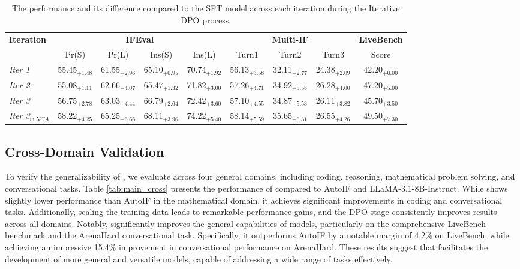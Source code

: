 \begin{table*}[ht]
    \centering
    \small
    \caption{The performance and its difference compared to the SFT model across each iteration during the Iterative DPO process.}
    \begin{tabular}{lcccccccc}
    \toprule
    \multirow{2}{*}{\textbf{Iteration}} &  \multicolumn{4}{c}{\textbf{IFEval}} & \multicolumn{3}{c}{\textbf{Multi-IF}} & \textbf{LiveBench} \\ 
    \cmidrule(r){2-5}  \cmidrule(r){6-8} \cmidrule(r){9-9} 
    & Pr(S) & Pr(L) & Ins(S) & Ins(L) & Turn1 & Turn2 & Turn3 & Score \\ 
    \midrule
    \textit{Iter 1} & 55.45$_{+1.48}$ & 61.55$_{+2.96}$ & 65.10$_{+0.95}$ & 70.74$_{+1.92}$ & 56.13$_{+3.58}$ & 32.11$_{+2.77}$ & 24.38$_{+2.09}$ & 42.20$_{+0.00}$ \\
    \textit{Iter 2} & 55.08$_{+1.11}$ & 62.66$_{+4.07}$ & 65.47$_{+1.32}$ & 71.82$_{+3.00}$ & 57.26$_{+4.71}$ & 34.92$_{+5.58}$ & 26.28$_{+4.00}$ & 47.20$_{+5.00}$ \\
    \textit{Iter 3} & 56.75$_{+2.78}$ & 63.03$_{+4.44}$ & 66.79$_{+2.64}$ & 72.42$_{+3.60}$ & 57.10$_{+4.55}$ & 34.87$_{+5.53}$ & 26.11$_{+3.82}$ & 45.70$_{+3.50}$ \\
    \textit{Iter 3$_{w. NCA}$}  & 58.22$_{+4.25}$ & 65.25$_{+6.66}$ & 68.11$_{+3.96}$ & 74.22$_{+5.40}$ & 58.14$_{+5.59}$ & 35.65$_{+6.31}$ & 26.55$_{+4.26}$ & 49.50$_{+7.30}$ \\
    \bottomrule
    \end{tabular}
    \label{tab:iterative_dpo}
\end{table*}


\subsection{Cross-Domain Validation}
To verify the generalizability of \method, we evaluate \method across four general domains, including coding, reasoning, mathematical problem solving, and conversational tasks. Table \ref{tab:main_cross} presents the performance of \method compared to AutoIF and LLaMA-3.1-8B-Instruct. While \method shows slightly lower performance than AutoIF in the mathematical domain, it achieves significant improvements in coding and conversational tasks. Additionally, scaling the training data leads to remarkable performance gains, and the DPO stage consistently improves results across all domains. Notably, \method significantly improves the general capabilities of models, particularly on the comprehensive LiveBench benchmark \citep{white2024livebench} and the ArenaHard \citep{li2024crowdsourced} conversational task. Specifically, it outperforms AutoIF by a notable margin of 4.2\% on LiveBench, while achieving an impressive 15.4\% improvement in conversational performance on ArenaHard. These results suggest that \method facilitates the development of more general and versatile models, capable of addressing a wide range of tasks effectively.



